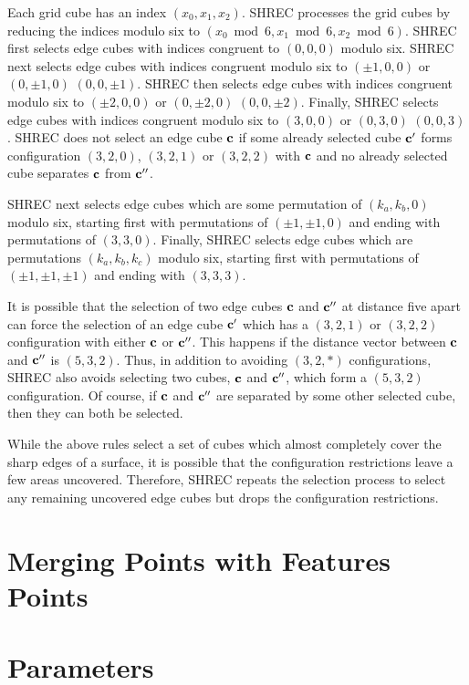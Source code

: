 Each grid cube has an index $(x_0, x_1, x_2)$.
SHREC processes the grid cubes by reducing the indices modulo six
to $(x_0 \bmod 6, x_1 \bmod 6, x_2 \bmod 6)$.
SHREC first selects edge cubes with indices congruent to $(0,0,0)$ modulo six.
SHREC next selects edge cubes with indices congruent modulo six
to $(\pm 1,0,0)$ or $(0, \pm 1, 0)$ $(0, 0, \pm 1)$.
SHREC then selects edge cubes with indices congruent modulo six
to $(\pm 2,0,0)$ or $(0, \pm 2, 0)$ $(0, 0, \pm 2)$.
Finally, SHREC selects edge cubes with indices congruent modulo six
to $(3,0,0)$ or $(0, 3, 0)$ $(0, 0, 3)$.
SHREC does not select an edge cube $\mathbf{c}$ if some already selected cube $\mathbf{c}'$
forms configuration $(3,2,0)$, $(3,2,1)$ or $(3,2,2)$ with $\mathbf{c}$
and no already selected cube separates $\mathbf{c}$ from $\mathbf{c}''$.

SHREC next selects edge cubes which are some permutation
of $(k_a,k_b,0)$ modulo six,
starting first with permutations of $(\pm 1, \pm 1, 0)$
and ending with permutations of $(3, 3, 0)$.
Finally, SHREC selects edge cubes which are permutations
$(k_a, k_b, k_c)$ modulo six,
starting first with permutations of $(\pm 1, \pm 1, \pm 1)$
and ending with $(3, 3, 3)$.

It is possible that the selection of two edge cubes $\mathbf{c}$ and $\mathbf{c}''$
at distance five apart can force the selection of an edge cube $\mathbf{c}'$
which has a $(3,2,1)$ or $(3,2,2)$ configuration 
with either $\mathbf{c}$ or $\mathbf{c}''$.
This happens if the distance vector between $\mathbf{c}$ and $\mathbf{c}''$
is $(5,3,2)$.
Thus, in addition to avoiding $(3,2,*)$ configurations,
SHREC also avoids selecting two cubes, $\mathbf{c}$ and $\mathbf{c}''$, 
which form a $(5,3,2)$ configuration.
Of course, if $\mathbf{c}$ and $\mathbf{c}''$ are separated by some other selected cube,
then they can both be selected.

While the above rules select a set of cubes which almost completely cover
the sharp edges of a surface,
it is possible that the configuration restrictions leave a few areas uncovered.
Therefore, SHREC repeats the selection process to select any remaining
uncovered edge cubes but drops the configuration restrictions.


\section{Merging Points with Features Points}
\label{section:merging}

\section{Parameters}
\label{section:parameters}

